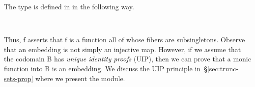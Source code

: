 The  type is defined in \typtop in the following way.
\ccpad
\begin{code}%
\>[1]\AgdaSpace{}%
\AgdaSymbol{:}\AgdaSpace{}%
\AgdaSymbol{(}\AgdaSpace{}%
\AgdaSpace{}%
\AgdaSymbol{)}\AgdaSpace{}%
\AgdaSpace{}%
\AgdaSpace{}%
\AgdaSpace{}%
\AgdaSpace{}%
\<%
\\
%
\>[1]\AgdaSpace{}%
\AgdaSpace{}%
\AgdaSymbol{=}\AgdaSpace{}%
\AgdaSpace{}%
\AgdaSpace{}%
\AgdaSpace{}%
\AgdaSpace{}%
\AgdaSymbol{(}\AgdaSpace{}%
\AgdaSpace{}%
\AgdaSymbol{)}\<%
\end{code}
\ccpad
Thus,  \ab f asserts that \ab f is a function all of whose fibers are subsingletons. Observe that an embedding is not simply an injective map. However, if we assume that the codomain \ab B has \emph{unique identity proofs} (UIP), then we can prove that a monic function into \ab B is an embedding. We discuss the UIP principle in~\S\ref{sec:trunc-sets-prop} where we present the  module.

